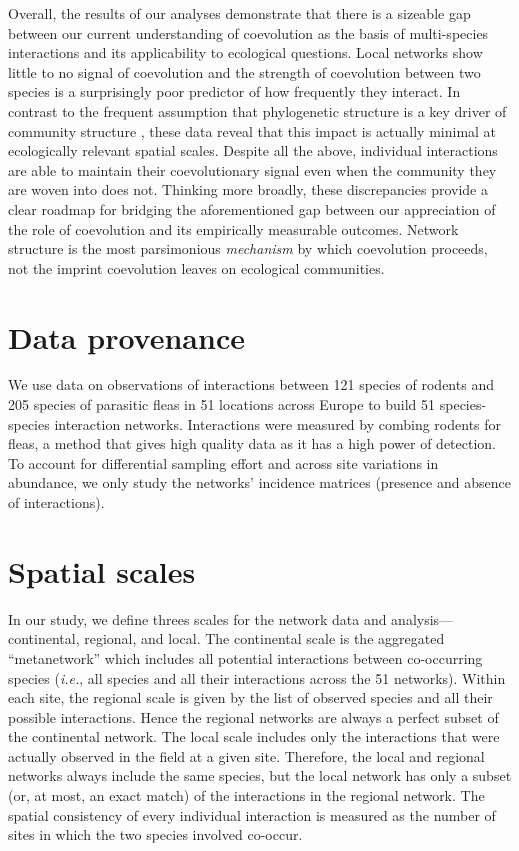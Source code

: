 \documentclass{pnastwo}
\begin{document}
\begin{article}
Overall, the results of our analyses demonstrate that there is a
sizeable gap between our current understanding of coevolution as the
basis of multi-species interactions and its applicability to ecological
questions. Local networks show little to no signal of coevolution and
the strength of coevolution between two species is a surprisingly poor
predictor of how frequently they interact. In contrast to the frequent
assumption that phylogenetic structure is a key driver of community
structure \cite{cave09}, these data reveal that this impact is actually
minimal at ecologically relevant spatial scales. Despite all the above,
individual interactions are able to maintain their coevolutionary signal
even when the community they are woven into does not. Thinking more
broadly, these discrepancies provide a clear roadmap for bridging the
aforementioned gap between our appreciation of the role of coevolution
and its empirically measurable outcomes. Network structure is the most
parsimonious \emph{mechanism} by which coevolution proceeds, not the
imprint coevolution leaves on ecological communities.


\begin{materials}
\section{Data provenance} We use data on observations of interactions between 121 species of
rodents and 205 species of parasitic fleas in 51 locations across Europe
\cite{kras12b} to build 51 species-species interaction networks.
Interactions were measured by combing rodents for fleas, a method that
gives high quality data as it has a high power of detection. To account
for differential sampling effort and across site variations in
abundance, we only study the networks' incidence matrices (presence and
absence of interactions).

\section{Spatial scales} In our study, we define threes scales for the network data and
analysis---continental, regional, and local. The continental scale is
the aggregated ``metanetwork'' which includes all potential interactions
between co-occurring species \cite{pois12c} (\emph{i.e.}, all species
and all their interactions across the 51 networks). Within each site,
the regional scale is given by the list of observed species and all
their possible interactions. Hence the regional networks are always a
perfect subset of the continental network. The local scale includes only
the interactions that were actually observed in the field at a given
site. Therefore, the local and regional networks always include the same
species, but the local network has only a subset (or, at most, an exact
match) of the interactions in the regional network. The spatial
consistency of every individual interaction is measured as the number of
sites in which the two species involved co-occur.


\end{materials}
\end{article}
\end{document}
